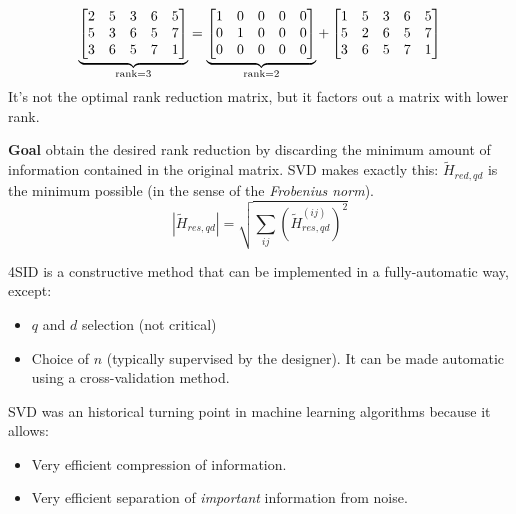 \begin{example}
    \[
        \underbrace{\begin{bmatrix}
            2 & 5 & 3 & 6 & 5 \\
            5 & 3 & 6 & 5 & 7 \\
            3 & 6 & 5 & 7 & 1
        \end{bmatrix}}_{\operatorname{rank} = 3}
        =
        \underbrace{\begin{bmatrix}
            1 & 0 & 0 & 0 & 0 \\
            0 & 1 & 0 & 0 & 0 \\
            0 & 0 & 0 & 0 & 0
        \end{bmatrix}}_{\operatorname{rank} = 2}
        +
        \begin{bmatrix}
            1 & 5 & 3 & 6 & 5 \\
            5 & 2 & 6 & 5 & 7 \\
            3 & 6 & 5 & 7 & 1
        \end{bmatrix}
    \]
    It's not the optimal rank reduction matrix, but it factors out a matrix with lower rank.

    \textbf{Goal} obtain the desired rank reduction by discarding the minimum amount of information contained in the original matrix.
    SVD makes exactly this: $\tilde{H}_{red,qd}$ is the minimum possible (in the sense of the \emph{Frobenius norm}).
    \[
        \left|\tilde{H}_{res,qd}\right| = \sqrt{\sum_{ij} \left(\tilde{H}_{res,qd}^{(ij)} \right)^2}
    \]
\end{example}

\begin{remark}
    4SID is a constructive method that can be implemented in a fully-automatic way, except:
    \begin{itemize}
        \item $q$ and $d$ selection (not critical)
        \item Choice of $n$ (typically supervised by the designer). It can be made automatic using a cross-validation method.
    \end{itemize}
\end{remark}

\begin{remark}
    SVD was an historical turning point in machine learning algorithms because it allows:
    \begin{itemize}
        \item Very efficient compression of information.
        \item Very efficient separation of \emph{important} information from noise.
    \end{itemize}
\end{remark}
